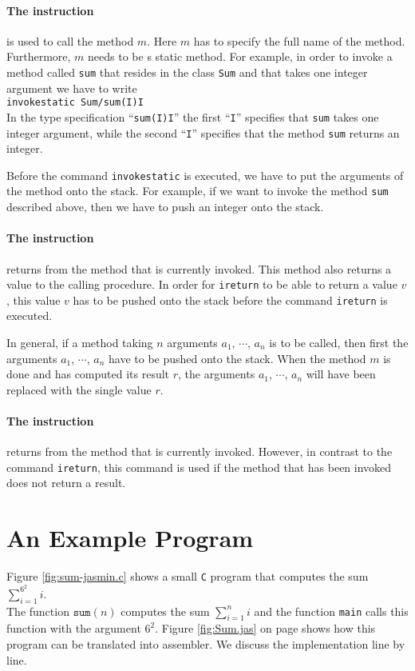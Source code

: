 \paragraph{The instruction }
is used to call the method $m$.  Here $m$ has to  specify the full name of the method.
Furthermore, $m$ needs to be s static method.
For example, in order to invoke a  method called \texttt{sum} that resides in the class \texttt{Sum}
and that takes one integer argument we have to write 
\\[0.2cm]
\hspace*{1.3cm}
\texttt{invokestatic  Sum/sum(I)I}
\\[0.2cm]
In the type specification ``\texttt{sum(I)I}'' the first ``\texttt{I}'' specifies that \texttt{sum}
takes one integer argument, while the second ``\texttt{I}'' specifies that the method \texttt{sum}
returns an integer.

Before the command \texttt{invokestatic} is executed, we have to put the arguments of the method
onto the stack.  For example, if we want to invoke the method \texttt{sum} described  above, then we
have to push an integer onto the stack.


\paragraph{The instruction }
returns from the method that is currently invoked.  This method also returns a value to the calling
procedure.  In order for \texttt{ireturn} to be able to return a value $v$, this value $v$ has to be
pushed onto the stack before the command \texttt{ireturn} is executed.

In general, if a method taking $n$ arguments $a_1$, $\cdots$, $a_n$ is to be called, then first the
arguments $a_1$, $\cdots$, $a_n$ have to be pushed onto the stack.  When the method $m$ is done and
has computed its result $r$, the arguments $a_1$, $\cdots$, $a_n$ will have been replaced with the
single value $r$.

\paragraph{The instruction }
returns from the method that is currently invoked.  However, in contrast to the command
\texttt{ireturn}, this command is used if the method that has been invoked  does not return a result. 

\section{An Example Program}
Figure \ref{fig:sum-jasmin.c} shows a small \texttt{C} program that computes the sum
\\[0.2cm]
\hspace*{1.3cm}
$\sum\limits_{i=1}^{6^2} i$.
\\[0.2cm]
The function $\mathtt{sum}(n)$ computes the sum $\sum_{i=1}^{n} i$ and the function
\texttt{main} calls this function with the argument $6^2$.  Figure \ref{fig:Sum.jas} on page
\pageref{fig:Sum.jas} shows how this program can be translated 
into assembler.  We discuss the implementation line by line.


